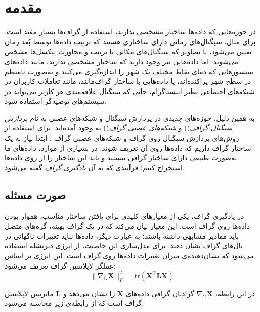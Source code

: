 \documentclass[12pt,onecolumn,a4paper]{article}
\begin{document}
    \section{مقدمه}
    در حوزه‌هایی که داده‌ها ساختار مشخصی ندارند، استفاده از گراف‌ها بسیار مفید است. برای مثال، سیگنال‌های زمانی دارای ساختاری هستند که ترتیب داده‌ها توسط بُعد زمان تعیین می‌شود، یا تصاویر که سیگنال‌های مکانی با ترتیب و مجاورت پیکسل‌ها مشخص می‌شوند. اما داده‌هایی نیز وجود دارند که ساختار مشخصی ندارند، مانند داده‌های سنسورهایی که دمای نقاط مختلف یک شهر را اندازه‌گیری می‌کنند و به‌صورت نامنظم در سطح شهر پراکنده‌اند، یا داده‌هایی با ساختار گراف‌مانند، مانند تعاملات کاربران در شبکه‌های اجتماعی نظیر اینستاگرام، جایی که سیگنال علاقه‌مندی هر کاربر می‌تواند در سیستم‌های توصیه‌گر استفاده شود.
    
    به همین دلیل، حوزه‌های جدیدی در پردازش سیگنال و شبکه‌های عصبی به نام 
	\textit{پردازش سیگنال گرافی}()\cite{GSP}
     و
	\textit{شبکه‌های عصبی گراف}()\cite{GNN}
      به وجود آمده‌اند.
      برای استفاده از روش‌های پردازش سیگنال روی گراف و شبکه‌های عصبی گراف ، ابتدا نیاز به یک ساختار گراف داریم که داده‌ها روی آن تعریف شوند. در بسیاری از موارد، داده‌های ما به‌صورت طبیعی دارای ساختار گرافی نیستند و باید این ساختار را از روی داده‌ها استخراج کنیم؛ فرآیندی که به آن 
            \textit{یادگیری گراف}
      گفته می‌شود.
      
     
     \subsection{صورت مسئله}
     
     
     
     در یادگیری گراف، یکی از معیارهای کلیدی برای یافتن ساختار مناسب، هموار بودن داده‌ها روی گراف است. این معیار بیان می‌کند که در یک گراف بهینه، گره‌های متصل باید مقادیر مشابهی داشته باشند؛ به عبارت دیگر، داده‌ها نباید تغییرات ناگهانی در یال‌های گراف نشان دهند. برای مدل‌سازی این خاصیت، از انرژی دیریشله استفاده می‌شود که نشان‌دهنده‌ی میزان تغییرات داده‌ها روی گراف است. این انرژی بر اساس عملگر لاپلاسین گراف تعریف می‌شود:
     \begin{equation}
     	     \|\nabla_G \bm{X}\|_F^2 = \text{tr} (\bm{X}^\top \bm{L} \bm{X})
     \end{equation}
     
     در این رابطه، \( \nabla_G \bm{X} \) گرادیان گرافی داده‌های \( \bm{X} \) را نشان می‌دهد و \( \bm{L} \) ماتریس لاپلاسین گراف است که از رابطه‌ی زیر محاسبه می‌شود:
     
\end{document}
